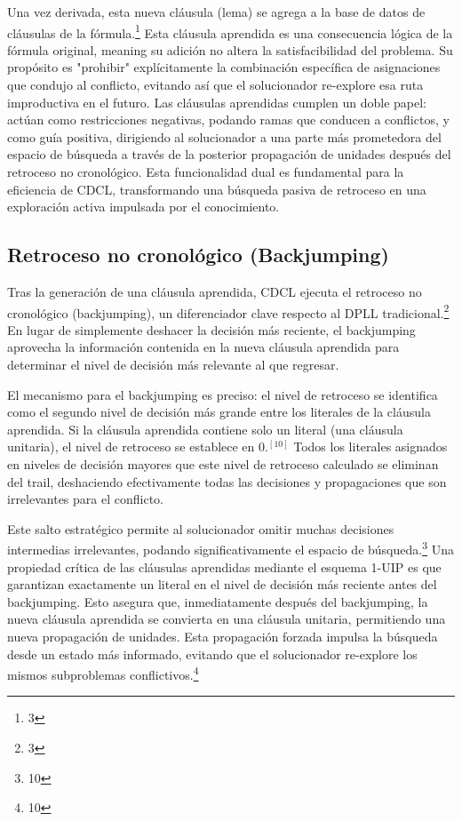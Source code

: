 \documentclass{article}
\begin{document}
Una vez derivada, esta nueva cláusula (lema) se agrega a la base de datos de cláusulas de la fórmula.\footnote{3} Esta cláusula aprendida es una consecuencia lógica de la fórmula original, meaning su adición no altera la satisfacibilidad del problema. Su propósito es "prohibir" explícitamente la combinación específica de asignaciones que condujo al conflicto, evitando así que el solucionador re-explore esa ruta improductiva en el futuro. Las cláusulas aprendidas cumplen un doble papel: actúan como restricciones negativas, podando ramas que conducen a conflictos, y como guía positiva, dirigiendo al solucionador a una parte más prometedora del espacio de búsqueda a través de la posterior propagación de unidades después del retroceso no cronológico. Esta funcionalidad dual es fundamental para la eficiencia de CDCL, transformando una búsqueda pasiva de retroceso en una exploración activa impulsada por el conocimiento.


\subsection{Retroceso no cronológico (Backjumping)}

Tras la generación de una cláusula aprendida, CDCL ejecuta el retroceso no cronológico (backjumping), un diferenciador clave respecto al DPLL tradicional.\footnote{3} En lugar de simplemente deshacer la decisión más reciente, el backjumping aprovecha la información contenida en la nueva cláusula aprendida para determinar el nivel de decisión más relevante al que regresar.

El mecanismo para el backjumping es preciso: el nivel de retroceso se identifica como el segundo nivel de decisión más grande entre los literales de la cláusula aprendida. Si la cláusula aprendida contiene solo un literal (una cláusula unitaria), el nivel de retroceso se establece en 0.$^{[10]}$ Todos los literales asignados en niveles de decisión mayores que este nivel de retroceso calculado se eliminan del trail, deshaciendo efectivamente todas las decisiones y propagaciones que son irrelevantes para el conflicto.

Este salto estratégico permite al solucionador omitir muchas decisiones intermedias irrelevantes, podando significativamente el espacio de búsqueda.\footnote{10} Una propiedad crítica de las cláusulas aprendidas mediante el esquema 1-UIP es que garantizan exactamente un literal en el nivel de decisión más reciente antes del backjumping. Esto asegura que, inmediatamente después del backjumping, la nueva cláusula aprendida se convierta en una cláusula unitaria, permitiendo una nueva propagación de unidades. Esta propagación forzada impulsa la búsqueda desde un estado más informado, evitando que el solucionador re-explore los mismos subproblemas conflictivos.\footnote{10}
\end{document}
